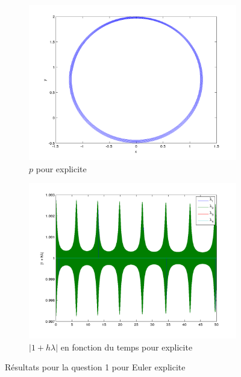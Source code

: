 \begin{figure}[!ht]
\begin{subfigure}[b]{0.45\textwidth}
    \includegraphics[width=\textwidth]{images/Q1_explicite_p.png}
    \caption{$p$ pour explicite}
    \label{fig:q1_explicite_p}
  \end{subfigure}
  \begin{subfigure}[b]{0.45\textwidth}
    \includegraphics[width=\textwidth]{images/Q1_explicite_lambda.png}
    \caption{$|1 + h\lambda|$ en fonction du temps pour explicite}
    \label{fig:q1_explicite_lambda}
  \end{subfigure}
  \caption{Résultats pour la question 1 pour Euler explicite}
  \label{fig:q1_exp}
\end{figure}

